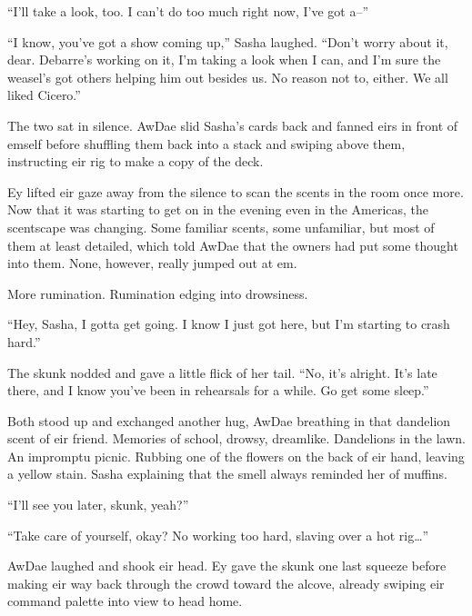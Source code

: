 ``I'll take a look, too. I can't do too much right now, I've got a--''

``I know, you've got a show coming up,'' Sasha laughed. ``Don't worry about it, dear. Debarre's working on it, I'm taking a look when I can, and I'm sure the weasel's got others helping him out besides us. No reason not to, either. We all liked Cicero.''

The two sat in silence. AwDae slid Sasha's cards back and fanned eirs in front of emself before shuffling them back into a stack and swiping above them, instructing eir rig to make a copy of the deck.

Ey lifted eir gaze away from the silence to scan the scents in the room once more. Now that it was starting to get on in the evening even in the Americas, the scentscape was changing. Some familiar scents, some unfamiliar, but most of them at least detailed, which told AwDae that the owners had put some thought into them. None, however, really jumped out at em.

More rumination. Rumination edging into drowsiness.

``Hey, Sasha, I gotta get going. I know I just got here, but I'm starting to crash hard.''

The skunk nodded and gave a little flick of her tail. ``No, it's alright. It's late there, and I know you've been in rehearsals for a while. Go get some sleep.''

Both stood up and exchanged another hug, AwDae breathing in that dandelion scent of eir friend. Memories of school, drowsy, dreamlike. Dandelions in the lawn. An impromptu picnic. Rubbing one of the flowers on the back of eir hand, leaving a yellow stain. Sasha explaining that the smell always reminded her of muffins.

``I'll see you later, skunk, yeah?''

``Take care of yourself, okay? No working too hard, slaving over a hot rig\ldots{}''

AwDae laughed and shook eir head. Ey gave the skunk one last squeeze before making eir way back through the crowd toward the alcove, already swiping eir command palette into view to head home.
